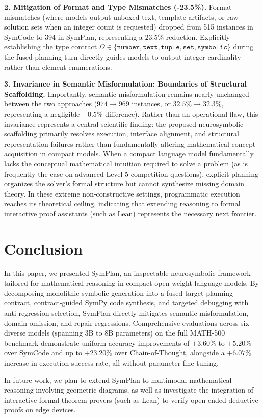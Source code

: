 \documentclass[runningheads]{llncs}
\begin{document}
\textbf{2. Mitigation of Format and Type Mismatches (-23.5\%).} Format mismatches (where models output unboxed text, template artifacts, or raw solution sets when an integer count is requested) dropped from 515 instances in SymCode to 394 in SymPlan, representing a $23.5\%$ reduction. Explicitly establishing the type contract $\Omega \in \{\texttt{number}, \texttt{text}, \texttt{tuple}, \texttt{set}, \texttt{symbolic}\}$ during the fused planning turn directly guides models to output integer cardinality rather than element enumerations.

\textbf{3. Invariance in Semantic Misformulation: Boundaries of Structural Scaffolding.} Importantly, semantic misformulation remains nearly unchanged between the two approaches ($974 \to 969$ instances, or $32.5\% \to 32.3\%$, representing a negligible $-0.5\%$ difference). Rather than an operational flaw, this invariance represents a central scientific finding: the proposed neurosymbolic scaffolding primarily resolves execution, interface alignment, and structural representation failures rather than fundamentally altering mathematical concept acquisition in compact models. When a compact language model fundamentally lacks the conceptual mathematical intuition required to solve a problem (as is frequently the case on advanced Level-5 competition questions), explicit planning organizes the solver's formal structure but cannot synthesize missing domain theory. In these extreme non-constructive settings, programmatic execution reaches its theoretical ceiling, indicating that extending reasoning to formal interactive proof assistants (such as Lean) represents the necessary next frontier.

\section{Conclusion}

In this paper, we presented SymPlan, an inspectable neurosymbolic framework tailored for mathematical reasoning in compact open-weight language models. By decomposing monolithic symbolic generation into a fused target-planning contract, contract-guided SymPy code synthesis, and targeted debugging with anti-regression selection, SymPlan directly mitigates semantic misformulation, domain omission, and repair regressions. Comprehensive evaluations across six diverse models (spanning 3B to 8B parameters) on the full MATH-500 benchmark demonstrate uniform accuracy improvements of $+3.60\%$ to $+5.20\%$ over SymCode and up to $+23.20\%$ over Chain-of-Thought, alongside a $+6.07\%$ increase in execution success rate, all without parameter fine-tuning.

In future work, we plan to extend SymPlan to multimodal mathematical reasoning involving geometric diagrams, as well as investigate the integration of interactive formal theorem provers (such as Lean) to verify open-ended deductive proofs on edge devices.



\end{document}
